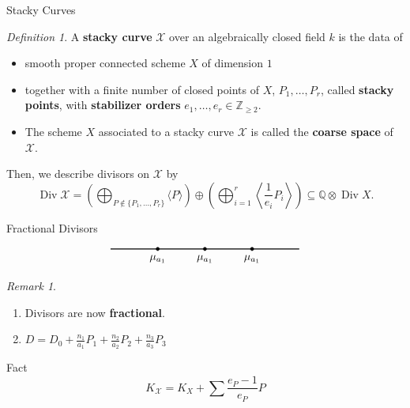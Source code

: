 \documentclass{beamer}
\theoremstyle{remark}
\newtheorem{rem}[thm]{Remark}
\newtheorem{defn}[thm]{Definition}
\newcommand\BQ{{\mathbb Q}}
\newcommand\BZ{{\mathbb Z}}
\newcommand \sx{{\mathscr X}}
\DeclareMathOperator\di{Div}
\begin{document}
\begin{frame}{Stacky Curves}
\begin{defn}
A \textbf{stacky curve} $\sx$ over an algebraically closed field $k$
is the data of
	\begin{itemize}
		\item smooth proper connected scheme $X$ of dimension $1$ \\ 
		\item together with a finite number of closed points of $X$, $P_
			1, \ldots, P_r$, called {\bf stacky points}, with {\bf stabilizer 
			orders} $e_1, \ldots, e_r \in \BZ_{\geq 2}.$ \\ 
		\item The scheme $X$ associated to a stacky curve $\sx$ is 
			called the {\bf coarse space} of $\sx$.
	\end{itemize}
\end{defn}



Then, we describe divisors on $\sx$ by
\[
	\di \sx = \left(\bigoplus_{P\notin \{P_1, \ldots, P_r\}} \langle 
	P \rangle \right) \oplus \left(\bigoplus_{i = 1}^r \left \langle 
	\frac{1}{e_i}P_i \right \rangle \right) \subseteq \BQ \otimes \di X.
\]

\end{frame}


\begin{frame}{Fractional Divisors}

\begin{equation} \label{pic:M-curve} \notag
  \begin{tikzpicture}
    \draw[thick] (-3,0) -- (3,0);
    \filldraw[draw=black,fill=black] (-1.5,0) node [below=2pt]
    {$\mu_{a_1}$} circle (1.5pt); \filldraw[draw=black,fill=black] (0,0)
    node [below=2pt] {$\mu_{a_1}$} circle (1.5pt);
    \filldraw[draw=black,fill=black] (1.5,0) node [below=2pt] {$\mu_{a_1}$}
    circle (1.5pt);
  \end{tikzpicture}
\end{equation}

\begin{rem}
  \begin{enumerate}
  \item Divisors are now \textbf{fractional}.
  \item $D = D_0 + \frac{n_{1}}{a_1}P_1 + \frac{n_{2}}{a_2}P_2 + \frac{n_{3}}{a_3}P_{3}$
  \end{enumerate}

\end{rem}

\begin{block}{Fact}
\[
	K_{\sx} = K_X + \sum \frac{e_P-1}{e_P} P
\]
\end{block}

\end{frame}
\end{document}
